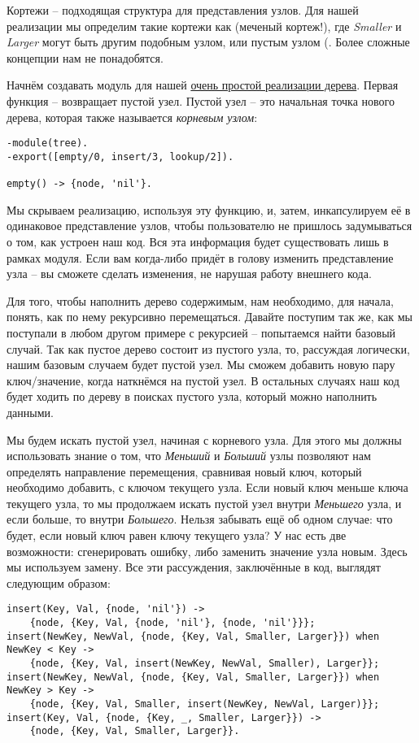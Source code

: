 Кортежи \--- подходящая структура для представления узлов.
Для нашей реализации мы определим такие кортежи как  (меченый кортеж!), где \emph{Smaller} и \emph{Larger} могут быть другим подобным узлом, или пустым узлом (.
Более сложные концепции нам не понадобятся.

Начнём создавать модуль для нашей \href{http://learnyousomeerlang.com/static/erlang/tree.erl}{очень простой реализации дерева}.
Первая функция  \--- возвращает пустой узел.
Пустой узел \--- это начальная точка нового дерева, которая также называется \emph{корневым узлом}:
\begin{lstlisting}[style=erlang]
-module(tree).
-export([empty/0, insert/3, lookup/2]).
 
empty() -> {node, 'nil'}.
\end{lstlisting}

Мы скрываем реализацию, используя эту функцию, и, затем, инкапсулируем её в одинаковое представление узлов, чтобы пользователю не пришлось задумываться о том, как устроен наш код.
Вся эта информация будет существовать лишь в рамках модуля.
Если вам когда\--либо придёт в голову изменить представление узла \--- вы сможете сделать изменения, не нарушая работу внешнего кода.

Для того, чтобы наполнить дерево содержимым, нам необходимо, для начала, понять, как по нему рекурсивно перемещаться.
Давайте поступим так же, как мы поступали в любом другом примере с рекурсией \--- попытаемся найти базовый случай.
Так как пустое дерево состоит из пустого узла, то, рассуждая логически, нашим базовым случаем будет пустой узел.
Мы сможем добавить новую пару ключ/значение, когда наткнёмся на пустой узел.
В остальных случаях наш код будет ходить по дереву в поисках пустого узла, который можно наполнить данными.

Мы будем искать пустой узел, начиная с корневого узла.
Для этого мы должны использовать знание о том, что \emph{Меньший} и \emph{Больший} узлы позволяют нам определять направление перемещения, сравнивая новый ключ, который необходимо добавить, с ключом текущего узла.
Если новый ключ меньше ключа текущего узла, то мы продолжаем искать пустой узел внутри \emph{Меньшего} узла, и если больше, то внутри \emph{Большего}.
Нельзя забывать ещё об одном случае: что будет, если новый ключ равен ключу текущего узла?
У нас есть две возможности: сгенерировать ошибку, либо заменить значение узла новым.
Здесь мы используем замену.
Все эти рассуждения, заключённые в код, выглядят следующим образом:
\begin{lstlisting}[style=erlang]
insert(Key, Val, {node, 'nil'}) ->
    {node, {Key, Val, {node, 'nil'}, {node, 'nil'}}};
insert(NewKey, NewVal, {node, {Key, Val, Smaller, Larger}}) when NewKey < Key ->
    {node, {Key, Val, insert(NewKey, NewVal, Smaller), Larger}};
insert(NewKey, NewVal, {node, {Key, Val, Smaller, Larger}}) when NewKey > Key ->
    {node, {Key, Val, Smaller, insert(NewKey, NewVal, Larger)}};
insert(Key, Val, {node, {Key, _, Smaller, Larger}}) ->
    {node, {Key, Val, Smaller, Larger}}.
\end{lstlisting}

